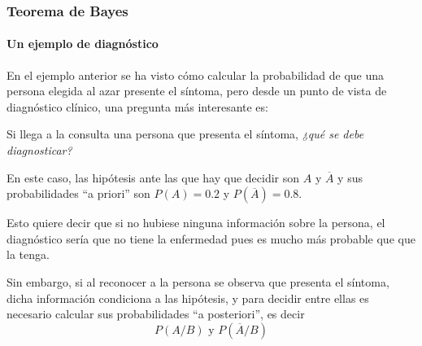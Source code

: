 \begin{frame}
\frametitle{Teorema de Bayes}
\framesubtitle{Un ejemplo de diagnóstico}
En el ejemplo anterior se ha visto cómo calcular la probabilidad de que una persona elegida al azar presente el síntoma, pero desde un punto
de vista de diagnóstico clínico, una pregunta más interesante es:
  
Si llega a la consulta una persona que presenta el síntoma, \emph{¿qué se debe diagnosticar?}

En este caso, las hipótesis ante las que hay que decidir son $A$ y $\overline A$ y sus probabilidades ``a priori'' son $P(A)=0.2$ y
$P(\overline A)=0.8$.

Esto quiere decir que si no hubiese ninguna información sobre la persona, el diagnóstico sería que no tiene la enfermedad pues es mucho más
probable que que la tenga.

Sin embargo, si al reconocer a la persona se observa que presenta el síntoma, dicha información condiciona a las hipótesis, y para decidir
entre ellas es necesario calcular sus probabilidades ``a posteriori'', es decir 
\[ P(A/B) \mbox{ y } P(\overline A/B)\]

\end{frame}


